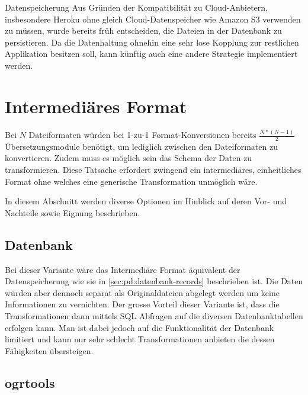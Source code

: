 \begin{decision}[label=dec:pd:datenspeicherung]{Datenspeicherung}
Aus Gründen der Kompatibilität zu Cloud-Anbietern, insbesondere Heroku ohne gleich Cloud-Datenspeicher wie Amazon S3 verwenden zu müssen, wurde bereits früh entscheiden, die Dateien in der Datenbank zu persistieren. Da die Datenhaltung ohnehin eine sehr lose Kopplung zur restlichen Applikation besitzen soll, kann künftig auch eine andere Strategie implementiert werden.
\end{decision}

\section{Intermediäres Format}

Bei $N$ Dateiformaten würden bei 1-zu-1 Format-Konversionen bereits $\frac{N*(N-1)}2$ Übersetzungsmodule benötigt, um lediglich zwischen den Dateiformaten zu konvertieren. Zudem muss es möglich sein das Schema der Daten zu transformieren. Diese Tatsache erfordert zwingend ein intermediäres, einheitliches Format ohne welches eine generische Transformation unmöglich wäre.

In diesem Abschnitt werden diverse Optionen im Hinblick auf deren Vor- und Nachteile sowie Eignung beschrieben. 

\subsection{Datenbank}
Bei dieser Variante wäre das Intermediäre Format äquivalent der Datenspeicherung wie sie in \cref{sec:pd:datenbank-records} beschrieben ist. Die Daten würden aber dennoch separat als Originaldateien abgelegt werden um keine Informationen zu vernichten. Der grosse Vorteil dieser Variante ist, dass die Transformationen dann mittels SQL Abfragen auf die diversen Datenbanktabellen erfolgen kann. Man ist dabei jedoch auf die Funktionalität der Datenbank limitiert und kann nur sehr schlecht Transformationen anbieten die dessen Fähigkeiten übersteigen.


\subsection{ogrtools}

